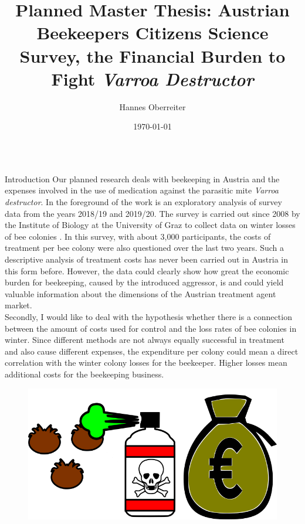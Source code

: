 \documentclass{beamer}
\title{Planned Master Thesis: Austrian Beekeepers Citizens Science Survey, the Financial Burden to Fight \textit{Varroa Destructor}}
\author[\faEnvelope{} hoberreiter@gmail.com \faTwitter{} @btree\_hannes]{Hannes Oberreiter}
\institute
{University Graz, Institut of Biology}
\date{\today}
\begin{document}
\begin{frame}{} 

\begin{columns}[t]
  \begin{column}{0.49\textwidth}

    \begin{block}{Introduction}
      Our planned research deals with beekeeping in Austria and the expenses involved in the use of medication against the parasitic mite \textit{Varroa destructor}. In the foreground of the work is an exploratory analysis of survey data from the years 2018/19 and 2019/20. The survey is carried out since 2008 by the Institute of Biology at the University of Graz to collect data on winter losses of bee colonies \citep{brodschneider2013}. In this survey, with about 3,000 participants, the costs of treatment per bee colony were also questioned over the last two years. Such a descriptive analysis of treatment costs has never been carried out in Austria in this form before. However, the data could clearly show how great the economic burden for beekeeping, caused by the introduced aggressor, is and could yield valuable information about the dimensions of the Austrian treatment agent market. \\
      Secondly, I would like to deal with the hypothesis whether there is a connection between the amount of costs used for control and the loss rates of bee colonies in winter. Since different methods are not always equally successful in treatment \citep{brodschneider2013, crailsheim2018, oberreiter2020} and also cause different expenses, the expenditure per colony could mean a direct correlation with the winter colony losses for the beekeeper. Higher losses mean additional costs for the beekeeping business.
      \begin{figure}
      \centering
      \includegraphics[width=.8\textwidth]{img/drawing.png}
      \end{figure}
    \end{block}


\end{column}
\end{columns}
\end{frame}
\end{document}

